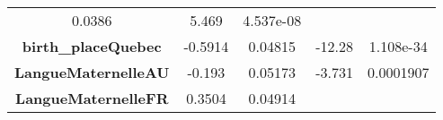 \documentclass[]{book}
\theoremstyle{definition}
\theoremstyle{definition}
\theoremstyle{remark}
\begin{document}
\begin{longtable}[]{@{}ccccc@{}}
\begin{minipage}[t]{0.16\columnwidth}
0.0386\strut
\end{minipage} & \begin{minipage}[t]{0.12\columnwidth}\centering\strut
5.469\strut
\end{minipage} & \begin{minipage}[t]{0.12\columnwidth}\centering\strut
4.537e-08\strut
\end{minipage}\tabularnewline
\begin{minipage}[t]{0.30\columnwidth}\centering\strut
\textbf{birth\_placeQuebec}\strut
\end{minipage} & \begin{minipage}[t]{0.13\columnwidth}\centering\strut
-0.5914\strut
\end{minipage} & \begin{minipage}[t]{0.16\columnwidth}\centering\strut
0.04815\strut
\end{minipage} & \begin{minipage}[t]{0.12\columnwidth}\centering\strut
-12.28\strut
\end{minipage} & \begin{minipage}[t]{0.12\columnwidth}\centering\strut
1.108e-34\strut
\end{minipage}\tabularnewline
\begin{minipage}[t]{0.30\columnwidth}\centering\strut
\textbf{LangueMaternelleAU}\strut
\end{minipage} & \begin{minipage}[t]{0.13\columnwidth}\centering\strut
-0.193\strut
\end{minipage} & \begin{minipage}[t]{0.16\columnwidth}\centering\strut
0.05173\strut
\end{minipage} & \begin{minipage}[t]{0.12\columnwidth}\centering\strut
-3.731\strut
\end{minipage} & \begin{minipage}[t]{0.12\columnwidth}\centering\strut
0.0001907\strut
\end{minipage}\tabularnewline
\begin{minipage}[t]{0.30\columnwidth}\centering\strut
\textbf{LangueMaternelleFR}\strut
\end{minipage} & \begin{minipage}[t]{0.13\columnwidth}\centering\strut
0.3504\strut
\end{minipage} & \begin{minipage}[t]{0.16\columnwidth}\centering\strut
0.04914\strut
\end{minipage} & \begin{minipage}[t]{0.12\columnwidth}\centering\strut

\end{minipage}
\end{longtable}
\end{document}
